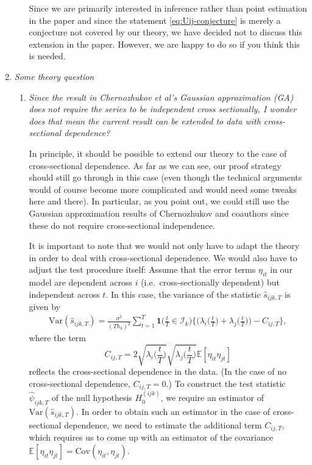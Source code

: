 \documentclass[a4paper,12pt]{article}
\begin{document}
\begin{enumerate}[label=(\arabic*),leftmargin=0.7cm]
\begin{enumerate}[label=(\roman*), leftmargin=0.8cm]
Since we are primarily interested in inference rather than point estimation in the paper and since the statement \eqref{eq:Uij-conjecture} is merely a conjecture not covered by our theory, we have decided not to discuss this extension in the paper. However, we are happy to do so if you think this is needed. 

\end{enumerate}


\item \textit{Some theory question}
\begin{enumerate}[label=(\alph*),leftmargin=0.7cm]
\item \textit{Since the result in Chernozhukov et al's Gaussian approximation (GA) does not require the series to be independent cross sectionally, I wonder does that mean the current result can be extended to data with cross-sectional dependence?}

In principle, it should be possible to extend our theory to the case of cross-sectional dependence. As far as we can see, our proof strategy should still go through in this case (even though the technical arguments would of course become more complicated and would need some tweaks here and there). In particular, as you point out, we could still use the Gaussian approximation results of Chernozhukov and coauthors since these do not require cross-sectional independence. 

It is important to note that we would not only have to adapt the theory in order to deal with cross-sectional dependence. We would also have to adjust the test procedure itself: Assume that the error terms $\eta_{it}$ in our model are dependent across $i$ (i.e.\ cross-sectionally dependent) but independent across $t$. In this case, the variance of the statistic $\hat{s}_{ijk,T}$ is given by
\begin{align*}
\text{Var}(\hat{s}_{ijk,T}) = \frac{\sigma^2}{(Th_k)^2} \sum_{t=1}^T \boldsymbol{1}\Big(\frac{t}{T} \in \mathcal{I}_k\Big) \bigg\{ \Big( \lambda_i\Big(\frac{t}{T}\Big) + \lambda_j\Big(\frac{t}{T}\Big) \Big) - C_{ij,T} \bigg\},    
\end{align*}
where the term 
\[ C_{ij,T} = 2 \sqrt{\lambda_i\Big(\frac{t}{T}\Big)} \sqrt{\lambda_j\Big(\frac{t}{T}\Big)} \mathbb{E}[\eta_{it} \eta_{jt}] \]
reflects the cross-sectional dependence in the data. (In the case of no cross-sectional dependence, $C_{ij,T} = 0$.) To construct the test statistic $\hat{\psi}_{ijk,T}$ of the null hypothesis $H_0^{(ijk)}$, we require an estimator of $\text{Var}(\hat{s}_{ijk,T})$. In order to obtain such an estimator in the case of cross-sectional dependence, we need to estimate the additional term $C_{ij,T}$, which requires us to come up with an estimator of the covariance $\mathbb{E}[\eta_{it} \eta_{jt}] = \text{Cov}(\eta_{it},\eta_{jt})$. 


\end{enumerate}
\end{enumerate}
\end{document}
